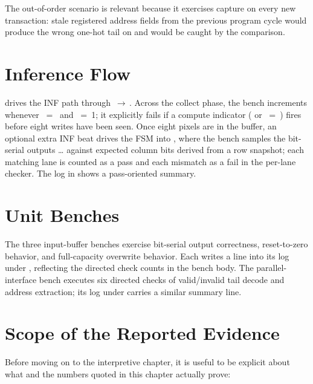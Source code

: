 The out-of-order scenario is relevant because it exercises
 capture on every new transaction: stale
registered address fields from the previous program cycle would produce
the wrong one-hot tail on  and would be caught
by the comparison.

\section{Inference Flow}
\label{sec:results-inf}

 drives the INF path through
\,\(\rightarrow\)\,.
Across the collect phase, the bench increments 
whenever ~=~ and
~=~1; it explicitly fails if a compute
indicator ( or ~=~)
fires before eight writes have been seen. Once eight pixels are in the
buffer, an optional extra INF beat drives the FSM into
, where the bench samples the bit-serial outputs
\ldots{} against expected column bits derived
from a row snapshot; each matching lane is counted as a pass and each
mismatch as a fail in the per-lane checker. The log in
shows a pass-oriented summary.

\section{Unit Benches}
\label{sec:results-unit}

The three input-buffer benches exercise bit-serial output correctness,
reset-to-zero behavior, and full-capacity overwrite behavior. Each
writes a  line into its log under
, reflecting the directed check counts
in the bench body. The parallel-interface bench
 executes six directed checks
of valid/invalid tail decode and address extraction; its log under
 carries a similar summary line.

\section{Scope of the Reported Evidence}
\label{sec:results-scope}

Before moving on to the interpretive chapter, it is useful to be
explicit about what  and the numbers quoted
in this chapter actually prove:

